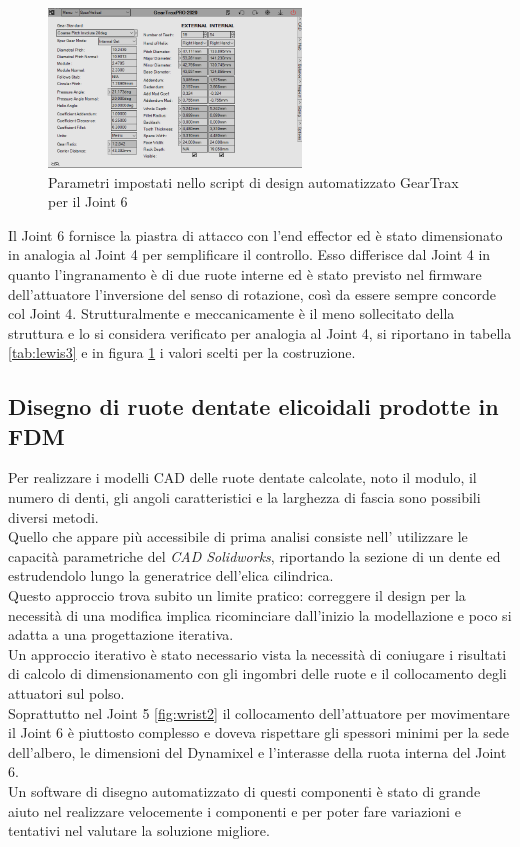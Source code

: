 \documentclass[%
corpo=11pt,
twoside,
 stile=classica,
oldstyle,
greek,%
]{toptesi}
\begin{document}
	\begin{figure} [H]
		\centering
		\includegraphics[width=0.6\textwidth]{Plots/POLSO3/gear_polso3.png}
		\caption{Parametri impostati nello script di design automatizzato GearTrax per il Joint 6}
		\label{fig:Gearpolso3}
	\end{figure} 
	Il Joint 6 fornisce la piastra di attacco con l'end effector ed è stato dimensionato in analogia al Joint 4 per semplificare il controllo. Esso differisce dal Joint 4 in quanto l'ingranamento è di due ruote interne ed è stato previsto nel firmware dell'attuatore l'inversione del senso di rotazione, così da essere sempre concorde col Joint 4. Strutturalmente e meccanicamente è il meno sollecitato della struttura e lo si considera verificato per analogia al Joint 4, si riportano in tabella \ref{tab:lewis3} e in figura \ref{fig:Gearpolso3} i valori scelti per la costruzione. 
	
		\subsection{Disegno di ruote dentate elicoidali prodotte in FDM}
		Per realizzare i modelli CAD delle ruote dentate calcolate, noto il modulo, il numero di denti, gli angoli caratteristici e la larghezza di fascia sono possibili diversi metodi.\\ 
		Quello che appare più accessibile di prima analisi consiste nell' utilizzare le capacità parametriche del \textit{ CAD Solidworks}, riportando la sezione di un dente ed estrudendolo lungo la generatrice dell'elica cilindrica. \\
		Questo approccio trova subito un limite pratico: correggere il design per la necessità di una modifica implica ricominciare dall'inizio la modellazione e poco si adatta a una progettazione iterativa. \\
		Un approccio iterativo è stato necessario vista la necessità di coniugare i risultati di calcolo di dimensionamento con gli ingombri delle ruote e il collocamento degli attuatori sul polso.\\
		 Soprattutto nel Joint 5 \ref{fig:wrist2} il collocamento dell'attuatore per movimentare il Joint 6 è piuttosto complesso e doveva rispettare gli spessori minimi per la sede dell'albero, le dimensioni del Dynamixel e l'interasse della ruota interna del Joint 6. \\
		Un software di disegno automatizzato di questi componenti è stato di grande aiuto nel realizzare velocemente i componenti e per poter fare variazioni e tentativi nel valutare la soluzione migliore. \\
		
\end{document}
